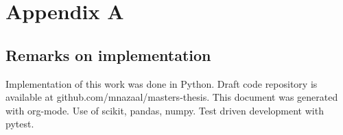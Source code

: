 \documentclass{tufte-book}
\begin{document}
 \newpage 






 \newpage 

\chapter{Appendix A}
\label{sec:org5dad294}
\section{Remarks on implementation}
\label{sec:orgbaa8dc5}
Implementation of this work was done in Python. Draft code repository is available at github.com/mnazaal/masters-thesis. This document was generated with org-mode. Use of scikit, pandas, numpy. Test driven development with pytest.
\end{document}

